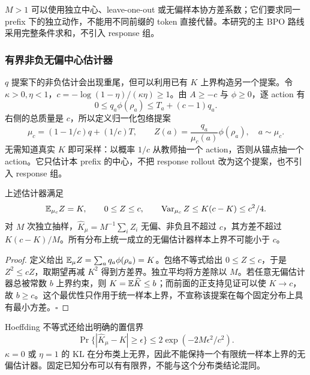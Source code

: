 $M>1$ 可以使用独立中心、leave-one-out 或无偏样本协方差系数；它们要求同一 prefix 下的独立动作，不能用不同前缀的 token 直接代替。本研究的主 BPO 路线采用完整条件求和，不引入 response 组。

\subsubsection{有界非负无偏中心估计器}

$q$ 提案下的非负估计会出现重尾，但可以利用已有 $K$ 上界构造另一个提案。令 $\kappa>0,\eta<1$，$c=-\log(1-\eta)/(\kappa\eta)\ge1$。由 $A\ge-c$ 与 $\phi\ge0$，逐 action 有
\begin{equation}
 0\le q_a\phi(\rho_a)\le T_a+(c-1)q_a.
\end{equation}
右侧的总质量是 $c$，所以定义归一化包络提案
\begin{equation}
 \mu_c=(1-1/c)q+(1/c)T,\qquad
 Z(a)=\frac{q_a}{\mu_c(a)}\phi(\rho_a),\quad a\sim\mu_c.
 \label{eq:center-bounded-mixture-estimator}
\end{equation}
无需知道真实 $K$ 即可采样：以概率 $1/c$ 从教师抽一个 action，否则从锚点抽一个 action。它只估计本 prefix 的中心，不把 response rollout 改为这个提案，也不引入 response 组。

\begin{theorem}[中心估计的最小统一样本上界]
\label{thm:center-bounded-estimator}
上述估计器满足
\begin{equation}
 \mathbb E_{\mu_c}Z=K,\qquad0\le Z\le c,\qquad
 \operatorname{Var}_{\mu_c}Z\le K(c-K)\le c^2/4.
\end{equation}
对 $M$ 次独立抽样，$\widehat K_\mu=M^{-1}\sum_iZ_i$ 无偏、非负且不超过 $c$，其方差不超过 $K(c-K)/M$。所有分布上统一成立的无偏估计器样本上界不可能小于 $c$。
\end{theorem}

\begin{proof}
定义给出 $\mathbb E_\mu Z=\sum_aq_a\phi(\rho_a)=K$。包络不等式给出 $0\le Z\le c$，于是 $Z^2\le cZ$，取期望再减 $K^2$ 得到方差界。独立平均将方差除以 $M$。若任意无偏估计器总被常数 $b$ 上界约束，则 $K=\mathbb E\widehat K\le b$；而前面的正支持见证可以使 $K\to c$，故 $b\ge c$。这个最优性只作用于统一样本上界，不宣称该提案在每个固定分布上具有最小方差。\hfill$\square$
\end{proof}

Hoeffding 不等式还给出明确的置信界
\begin{equation}
 \Pr\{ |\widehat K_\mu-K|\ge\epsilon\}
 \le2\exp(-2M\epsilon^2/c^2).
\end{equation}
$\kappa=0$ 或 $\eta=1$ 的 KL 在分布类上无界，因此不能保持一个有限统一样本上界的无偏估计器。固定已知分布可以有有限界，不能与这个分布类结论混同。

